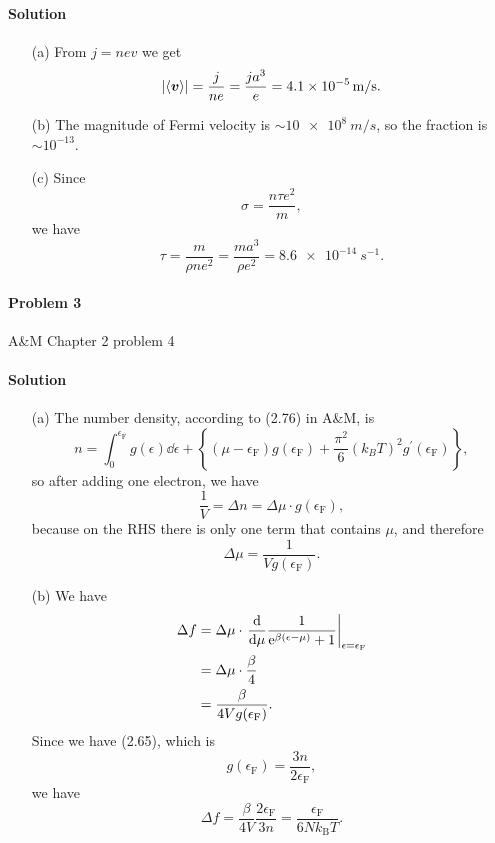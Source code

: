 \documentclass[hyperref, a4paper]{article}
\newcommand*{\ee}{\mathrm{e}}
\begin{document}
\paragraph{Solution} \begin{itemize}
\item[(a)] From $j = n e v$ we get 
\[
    \abs{\expval{\vb*{v}}} = \frac{j}{n e} = \frac{j a^3}{e} = \SI{4.1e-5}{m/s}.
\]
\item[(b)] The magnitude of Fermi velocity is $\sim \SI{10e8}{m/s}$, 
so the fraction is $\sim 10^{-13}$.
\item[(c)] Since 
\begin{equation}
    \sigma = \frac{n \tau e^2}{m},
\end{equation}
we have 
\[
    \tau = \frac{m}{\rho n e^2} = \frac{m a^3}{\rho e^2} = \SI{8.6e-14}{s^{-1}}.
\]
\end{itemize}

\paragraph{Problem 3} A\&M Chapter 2 problem 4

\paragraph{Solution} \begin{itemize}
\item[(a)] The number density, according to (2.76) in A\&M, is 
\begin{equation}
    n=\int_0^{\epsilon_\text{F}} g(\epsilon) \dd \epsilon +\left\{\left(\mu-\epsilon_\text{F}\right) g\left(\epsilon_\text{F}\right)+\frac{\pi^2}{6}\left(k_B T\right)^2 g^{\prime}\left(\epsilon_\text{F}\right)\right\} ,
\end{equation}
so after adding one electron, we have 
\[
    \frac{1}{V} = \Delta n = \Delta \mu \cdot g(\epsilon_{\text{F}}),
\]
because on the RHS there is only one term that contains $\mu$,
and therefore 
\begin{equation}
    \Delta \mu = \frac{1}{V g(\epsilon_{\text{F}})}.
\end{equation}
\item[(b)] We have
\[
    \begin{aligned}
        \Delta f &= \Delta \mu \cdot \eval{\dv{\mu} 
        \frac{1}{\ee^{\beta (\epsilon - \mu)} + 1}}_{\epsilon = \epsilon_{\text{F}}}  \\
        &= \Delta \mu \cdot \frac{\beta}{4} \\
        &= \frac{\beta}{4 V g(\epsilon_{\text{F}})}. 
    \end{aligned}
\]
Since we have (2.65), which is 
\[
    g(\epsilon_{\text{F}}) = \frac{3 n }{2 \epsilon_{\text{F}}},
\]
we have 
\begin{equation}
    \Delta f =  \frac{\beta}{4 V } \frac{2 \epsilon_{\text{F}}}{3 n} 
    = \frac{\epsilon_{\text{F}}}{6 N k_{\text{B}} T}.
\end{equation}
\end{itemize}
\end{document}
